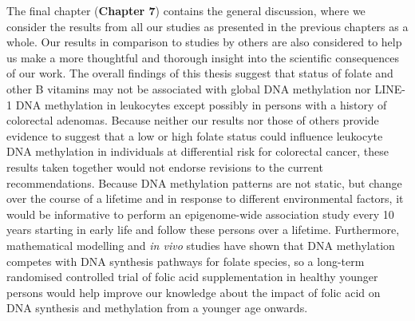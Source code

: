 \noindent The final chapter (\textbf{Chapter 7}) contains the general discussion, where we consider the results from all our studies as presented in the previous chapters as a whole. Our results in comparison to studies by others are also considered to help us make a more thoughtful and thorough insight into the scientific consequences of our work. The overall findings of this thesis suggest that status of folate and other B vitamins may not be associated with global DNA methylation nor LINE-1 DNA methylation in leukocytes except possibly in persons with a history of colorectal adenomas. Because neither our results nor those of others provide evidence to suggest that a low or high folate status could influence leukocyte DNA methylation in individuals at differential risk for colorectal cancer, these results taken together would not endorse revisions to the current recommendations. Because DNA methylation patterns are not static, but change over the course of a lifetime and in response to different environmental factors, it would be informative to perform an epigenome-wide association study every 10 years starting in early life and follow these persons over a lifetime. Furthermore, mathematical modelling and \emph{in vivo} studies have shown that DNA methylation competes with DNA synthesis pathways for folate species, so a long-term randomised controlled trial of folic acid supplementation in healthy younger persons would help improve our knowledge about the impact of folic acid on DNA synthesis and methylation from a younger age onwards.
